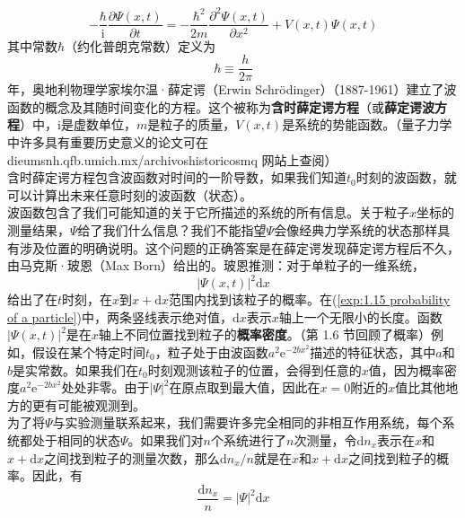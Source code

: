 	\begin{equation}
		-\frac{\hbar}{\mathrm{i}}\frac{\partial \Psi \left(x,t\right)}{\partial t}= -\frac{\hbar^2}{2m}\frac{\partial^2 \Psi \left(x,t\right)}{\partial x^2}+ V\left(x,t\right)\Psi\left(x,t\right)
		\label{eq:1.13 Time-dependent Schödinger equation}
	\end{equation}
	其中常数$\hbar$（约化普朗克常数）定义为
	\begin{equation}
		\boxed{\hbar \equiv \frac{h}{2 \pi}}
		\label{eq:1.14 h-bar's definition}
	\end{equation}
	 年，奥地利物理学家埃尔温·薛定谔（Erwin Schrödinger）（1887-1961）建立了波函数的概念及其随时间变化的方程。这个被称为\textbf{含时薛定谔方程}（或\textbf{薛定谔波方程}）中，$\mathrm{i}$是虚数单位，$m$是粒子的质量，$V\left(x,t\right)$是系统的势能函数。（量子力学中许多具有重要历史意义的论文可在 dieumsnh.qfb.umich.mx/archivoshistoricosmq 网站上查阅）\\
	\indent 含时薛定谔方程包含波函数对时间的一阶导数，如果我们知道$t_0$时刻的波函数，就可以计算出未来任意时刻的波函数（状态）。\\
	\indent 波函数包含了我们可能知道的关于它所描述的系统的所有信息。关于粒子$x$坐标的测量结果，$\Psi$给了我们什么信息？我们不能指望$\Psi$会像经典力学系统的状态那样具有涉及位置的明确说明。这个问题的正确答案是在薛定谔发现薛定谔方程后不久，由马克斯·玻恩（Max Born）给出的。玻恩推测：对于单粒子的一维系统，
	\begin{equation}
		\left|\Psi \left(x,t\right)\right|^2 \mathrm{d}x
		\label{exp:1.15 probability of a particle}
	\end{equation}
	给出了在$t$时刻，在$x$到$x+ \mathrm{d}x$范围内找到该粒子的概率。在(\ref{exp:1.15 probability of a particle})中，两条竖线表示绝对值，$\mathrm{d}x$表示$x$轴上一个无限小的长度。函数$\left|\Psi \left(x,t\right)\right|^2$是在$x$轴上不同位置找到粒子的\textbf{概率密度}。（第 1.6 节回顾了概率）例如，假设在某个特定时间$t_0$，粒子处于由波函数$a^2\mathrm{e}^{-2bx^2}$描述的特征状态，其中$a$和$b$是实常数。如果我们在$t_0$时刻观测该粒子的位置，会得到任意的$x$值，因为概率密度$a^2\mathrm{e}^{-2bx^2}$处处非零。由于$\left|\Psi\right|^2$在原点取到最大值，因此在$x=0$附近的$x$值比其他地方的更有可能被观测到。\\
	\indent 为了将$\Psi$与实验测量联系起来，我们需要许多完全相同的非相互作用系统，每个系统都处于相同的状态$\Psi$。如果我们对$n$个系统进行了$n$次测量，令$\mathrm{d}n_x$表示在$x$和$x+\mathrm{d}x$之间找到粒子的测量次数，那么$\mathrm{d}n_x/n$就是在$x$和$x+\mathrm{d}x$之间找到粒子的概率。因此，有
	\begin{equation*}
		\frac{\mathrm{d}n_x}{n} = \left|\Psi\right|^2\mathrm{d}x
	\end{equation*}

